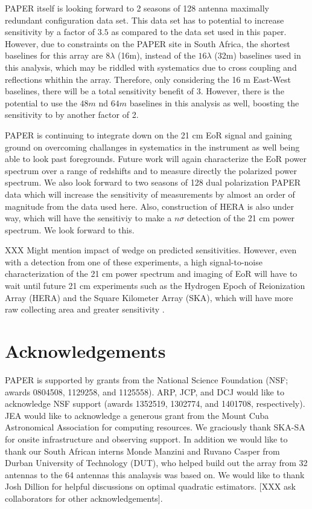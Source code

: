 \documentclass[twocolumn,numberedappendix]{emulateapj} \shorttitle{PSA64}
\begin{document}
PAPER itself is looking forward to 2 seasons of 128 antenna maximally redundant
configuration data set. This data set has to potential to increase  sensitivity
by a factor of $3.5$ as compared to the data set used in this paper. However,
due to constraints on the PAPER site in South Africa, the shortest baselines for
this array are $8\lambda$ (16m), instead of the $16\lambda$ (32m) baselines used
in this analysis, which may be riddled with systematics due to cross coupling
and reflections whithin the array. Therefore, only considering the 16 m
East-West baselines, there will be a total sensitivity benefit of $3$. However,
there is the potential to use the $48m$ nd $64m$ baselines in this analysis as
well, boosting the sensitivity to by another factor of 2. 

PAPER is continuing to integrate down on the 21 cm EoR signal and gaining ground
on overcoming challanges in systematics in the instrument as well being able to
look past foregrounds. Future work will again characterize the EoR power
spectrum over a range of redshifts and to measure directly the polarized power
spectrum. We also look forward to two seasons of 128 dual polarization PAPER
data which will increase the sensitivity of measurements by almost an order of
magnitude from the data used here. Also, construction of HERA is also under way,
which will have the sensitiviy to make a $n\sigma$ detection of the 21 cm power
spectrum. We look forward to this.


XXX Might mention impact of wedge on predicted sensitivities.
However, even with a detection from one of these experiments, a high signal-to-noise characterization of the 21 cm power spectrum and imaging of EoR will have to
wait until future 21 cm experiments such as the Hydrogen Epoch of Reionization
Array (HERA) and the Square Kilometer Array (SKA), which will have more raw
collecting area and greater sensitivity \citep{pober_et_al2014}.

\section{Acknowledgements} 

PAPER is supported by grants from the National Science Foundation (NSF; awards 0804508,
1129258, and 1125558).  ARP, JCP, and DCJ would like to acknowledge NSF support
(awards 1352519, 1302774, and 1401708, respectively).
JEA would like to acknowledge a generous grant from the Mount Cuba Astronomical Association for
computing resources.
We graciously thank SKA-SA for onsite infrastructure and observing support. In
addition we would like to thank our South African interns Monde Manzini and
Ruvano Casper from Durban University of Technology (DUT), who helped build out
the array from 32 antennas to the 64 antennas this analaysis was based on. 
We would like to thank Josh Dillion for helpful discussions on optimal quadratic
estimators. 
[XXX ask collaborators for other acknowledgements].



\end{document}

